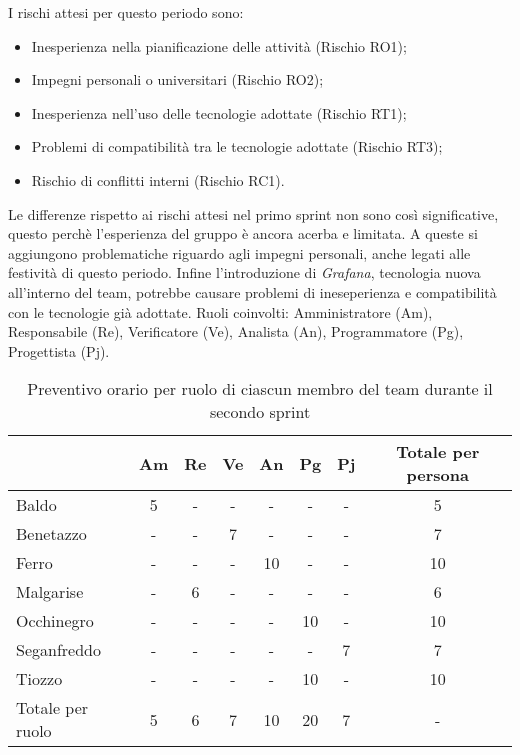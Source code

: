 I rischi attesi per questo periodo sono:
\begin{itemize}
    \item Inesperienza nella pianificazione delle attività (Rischio RO1);
    \item Impegni personali o universitari (Rischio RO2);
    \item Inesperienza nell'uso delle tecnologie adottate (Rischio RT1);
    \item Problemi di compatibilità tra le tecnologie adottate (Rischio RT3);
    \item Rischio di conflitti interni (Rischio RC1).
\end{itemize}
Le differenze rispetto ai rischi attesi nel primo sprint non sono così significative, questo perchè l'esperienza del gruppo è ancora acerba e limitata.
A queste si aggiungono problematiche riguardo agli impegni personali, anche legati alle festività di questo periodo. Infine l'introduzione di \textit{Grafana},
tecnologia nuova all'interno del team, potrebbe causare problemi di ineseperienza e compatibilità con le tecnologie già adottate.
\newpage
{}
Ruoli coinvolti: Amministratore (Am), Responsabile (Re), Verificatore (Ve), Analista (An),
Programmatore (Pg), Progettista (Pj).
\begin{table}[!h]
    \centering
    \begin{tabular}{ | l | c | c | c | c | c | c | c |} 
        \hline
        \textbf{} & \textbf{Am} & \textbf{Re} & \textbf{Ve} &\textbf{An} & \textbf{Pg} & \textbf{Pj} & \textbf{Totale per persona} \\
        \hline 
        Baldo            &  5   &  -   &  -   &  -   &  -   &  -   &  5   \\ 
        Benetazzo        &  -   &  -   &  7   &  -   &  -   &  -   &  7   \\ 
        Ferro            &  -   &  -   &  -   & 10   &  -   &  -   & 10   \\ 
        Malgarise        &  -   &  6   &  -   &  -   &  -   &  -   &  6   \\ 
        Occhinegro       &  -   &  -   &  -   &  -   & 10   &  -   & 10   \\ 
        Seganfreddo      &  -   &  -   &  -   &  -   &  -   &  7   &  7   \\
        Tiozzo           &  -   &  -   &  -   &  -   & 10   &  -   & 10   \\ 
        \hline
        Totale per ruolo &  5   &  6   &  7   & 10   & 20   &  7   &  -   \\
        \hline
    \end{tabular}
    \caption{Preventivo orario per ruolo di ciascun membro del team durante il secondo sprint}
    \label{tab:5}
\end{table}

